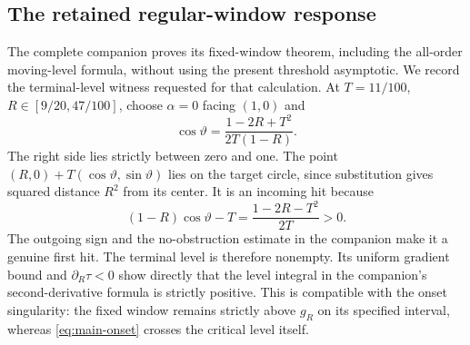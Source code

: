\subsection{The retained regular-window response}
The complete companion \cite{TC} proves its fixed-window theorem,
including the all-order moving-level formula, without using the present
threshold asymptotic. We record the terminal-level witness requested
for that calculation. At $T=11/100$, $R\in[9/20,47/100]$, choose
$\alpha=0$ facing $(1,0)$ and
\begin{equation}\label{eq:terminal-witness}
 \cos\vartheta=\frac{1-2R+T^2}{2T(1-R)}.
\end{equation}
The right side lies strictly between zero and one. The point
$(R,0)+T(\cos\vartheta,\sin\vartheta)$ lies on the target circle,
since substitution gives squared distance $R^2$ from its center.
It is an incoming hit because
\[
 (1-R)\cos\vartheta-T=\frac{1-2R-T^2}{2T}>0.
\]
The outgoing sign and the no-obstruction estimate in the companion
make it a genuine first hit. The terminal level is therefore nonempty.
Its uniform gradient bound and $\partial_R\tau<0$ show directly that
the level integral in the companion's second-derivative formula is
strictly positive. This is compatible with the onset singularity:
the fixed window remains strictly above $g_R$ on its specified interval,
whereas \eqref{eq:main-onset} crosses the critical level itself.
